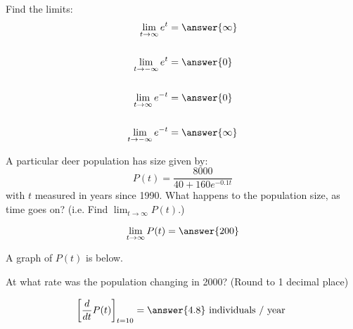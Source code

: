 \documentclass{ximera}
\author{Bobby Ramsey}
\begin{document}
\begin{exercise}

	Find the limits:
	\begin{align*}
		\lim_{t\to \infty} e^t &= \answer{\infty}\\
		\\
		\lim_{t \to -\infty} e^t &= \answer{0}\\
		\\
		\lim_{t\to \infty} e^{-t} &= \answer{0}\\
		\\
		\lim_{t \to -\infty} e^{-t} &= \answer{\infty}
	\end{align*}

	\begin{exercise}
	A particular deer population has size given by:
	\[ P(t) = \frac{8000}{40+160e^{-0.1t}} \]
	with $t$ measured in years since 1990.
	What happens to the population size, as time goes on? (i.e. Find $\displaystyle \lim_{t\to\infty}P(t)$.)
		
	\[ \lim_{t\to\infty} P(t) = \answer{200} \]
	
		\begin{exercise}
		
			A graph of $P(t)$ is below.
			

		At what rate was the population changing in 2000? (Round to 1 decimal place)
		
		\[ \eval{ \ddt{P(t)} }_{t=10} = \answer{4.8} \text{ individuals / year } \]	
	
		\end{exercise}
	\end{exercise}


\end{exercise}
\end{document}
